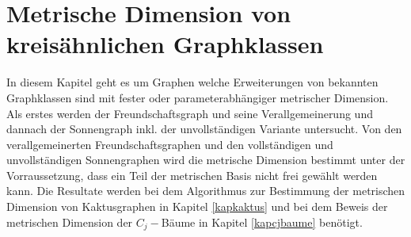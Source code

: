 \chapter{Metrische Dimension von kreisähnlichen Graphklassen}
In diesem Kapitel geht es um Graphen welche Erweiterungen von bekannten Graphklassen sind mit fester oder parameterabhängiger metrischer Dimension.\\Als erstes werden der Freundschaftsgraph und seine Verallgemeinerung und dannach der Sonnengraph inkl. der unvollständigen Variante untersucht.
Von den verallgemeinerten Freundschaftsgraphen und den vollständigen und unvollständigen Sonnengraphen wird die metrische Dimension bestimmt unter der Vorraussetzung, dass ein Teil der metrischen Basis nicht frei gewählt werden kann. Die Resultate werden bei dem Algorithmus zur Bestimmung der metrischen Dimension von Kaktusgraphen in Kapitel \ref{kapkaktus} und bei dem Beweis der metrischen Dimension der $C_j-$Bäume in Kapitel \ref{kapcjbaume} benötigt.
\vspace{-4mm}
